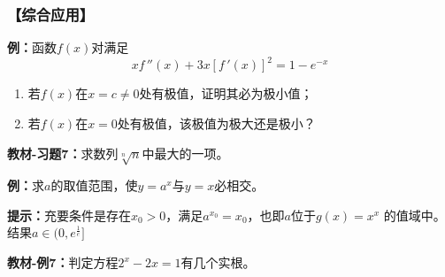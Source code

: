 \subsubsection{【综合应用】}

{\bf 例：}函数$f(x)$对满足
$$xf\,''(x)+3x[f\,'(x)]^2=1-e^{-x}$$
\begin{enumerate}[(1)]
  \setlength{\itemindent}{1cm}
  \item 若$f(x)$在$x=c\ne 0$处有极值，证明其必为极小值；
  \item 若$f(x)$在$x=0$处有极值，该极值为极大还是极小？
\end{enumerate}

{\bf 教材-习题7：}求数列$\sqrt[n]n$中最大的一项。

\begin{center}
\end{center}

{\bf 例：}求$a$的取值范围，使$y=a^x$与$y=x$必相交。

{\bf 提示：}充要条件是存在$x_0>0$，满足$a^{x_0}=x_0$，也即$a$位于$g(x)=x^{x}$
的值域中。结果$a\in(0,e^{\frac1e}]$

{\bf 教材-例7：}判定方程$2^x-2x=1$有几个实根。

\begin{center}
\end{center}



